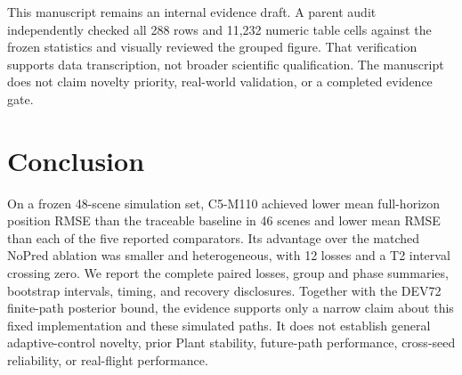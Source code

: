 \documentclass[11pt]{article}
\begin{document}
This manuscript remains an internal evidence draft. A parent audit independently checked all 288 rows and 11,232 numeric table cells against the frozen statistics and visually reviewed the grouped figure. That verification supports data transcription, not broader scientific qualification. The manuscript does not claim novelty priority, real-world validation, or a completed evidence gate.

\section{Conclusion}
On a frozen 48-scene simulation set, C5-M110 achieved lower mean full-horizon position RMSE than the traceable baseline in 46 scenes and lower mean RMSE than each of the five reported comparators. Its advantage over the matched NoPred ablation was smaller and heterogeneous, with 12 losses and a T2 interval crossing zero. We report the complete paired losses, group and phase summaries, bootstrap intervals, timing, and recovery disclosures. Together with the DEV72 finite-path posterior bound, the evidence supports only a narrow claim about this fixed implementation and these simulated paths. It does not establish general adaptive-control novelty, prior Plant stability, future-path performance, cross-seed reliability, or real-flight performance.



\end{document}
